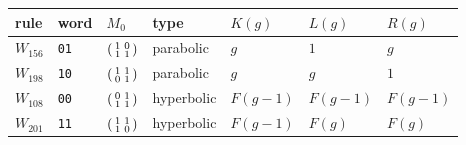 \begin{tabular}{lllllll}
\toprule
rule & word & $M_0$ & type & $K(g)$ & $L(g)$ & $R(g)$ \\
\midrule
$W_{156}$ & \texttt{01} & $\begin{psmallmatrix}1&0\\1&1\end{psmallmatrix}$ & parabolic & $g$ & $1$ & $g$ \\
$W_{198}$ & \texttt{10} & $\begin{psmallmatrix}1&1\\0&1\end{psmallmatrix}$ & parabolic & $g$ & $g$ & $1$ \\
$W_{108}$ & \texttt{00} & $\begin{psmallmatrix}0&1\\1&1\end{psmallmatrix}$ & hyperbolic & $F(g-1)$ & $F(g-1)$ & $F(g-1)$ \\
$W_{201}$ & \texttt{11} & $\begin{psmallmatrix}1&1\\1&0\end{psmallmatrix}$ & hyperbolic & $F(g-1)$ & $F(g)$ & $F(g)$ \\
\bottomrule
\end{tabular}
